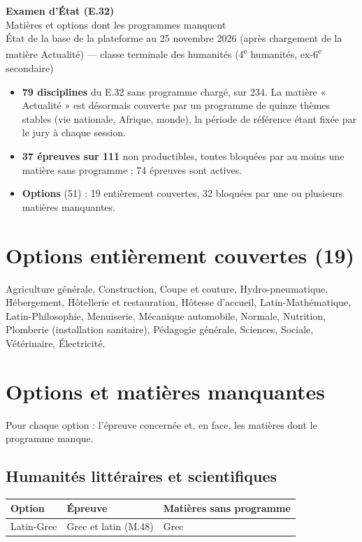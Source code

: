 \documentclass[11pt,a4paper]{article}
\begin{document}
{\color{nuit}\LARGE\bfseries Examen d'État (E.32)}\\[2pt]
{\color{nuit}\Large Matières et options dont les programmes manquent}\\[4pt]
{\color{encre2}État de la base de la plateforme au 25 novembre 2026 (après chargement de la matière Actualité) --- classe terminale des humanités (4\textsuperscript{e} humanités, ex-6\textsuperscript{e} secondaire)}

\vspace{8pt}
\begin{encadre}[title=Vue d'ensemble]
\begin{itemize}
\item \textbf{79 disciplines} du E.32 sans programme chargé, sur 234. La matière « Actualité » est désormais couverte par un programme de quinze thèmes stables (vie nationale, Afrique, monde), la période de référence étant fixée par le jury à chaque session.
\item \textbf{37 épreuves sur 111} non productibles, toutes bloquées par au moins une matière sans programme ; 74 épreuves sont actives.
\item \textbf{Options} (51) : 19 entièrement couvertes, 32 bloquées par une ou plusieurs matières manquantes.
\end{itemize}
\end{encadre}

\section{Options entièrement couvertes (19)}
Agriculture générale, Construction, Coupe et couture, Hydro-pneumatique, Hébergement, Hôtellerie et restauration, Hôtesse d'accueil, Latin-Mathématique, Latin-Philosophie, Menuiserie, Mécanique automobile, Normale, Nutrition, Plomberie (installation sanitaire), Pédagogie générale, Sciences, Sociale, Vétérinaire, Électricité.

\section{Options et matières manquantes}
Pour chaque option : l'épreuve concernée et, en face, les matières dont le programme manque.

\subsection{Humanités littéraires et scientifiques}
\begin{longtable}{@{}>{\raggedright\arraybackslash}p{3.4cm}>{\raggedright\arraybackslash}p{4.4cm}>{\raggedright\arraybackslash}p{7.4cm}@{}}
\toprule
\textbf{Option} & \textbf{Épreuve} & \textbf{Matières sans programme}\\
\midrule\endhead
Latin-Grec & Grec et latin (M.48) & Grec\\
\bottomrule
\end{longtable}
\end{document}

